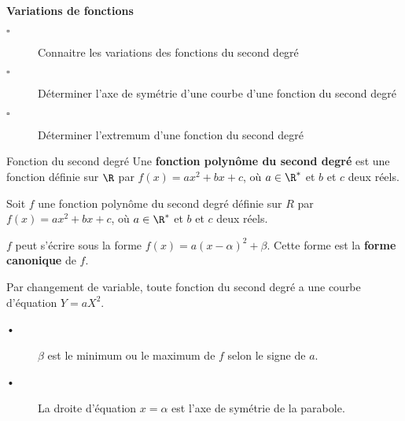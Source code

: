 \begin{titre}

\end{titre}


\begin{CpsCol}
\textbf{Variations de fonctions}
\begin{description}
\item[$\square$] Connaitre les variations des fonctions du second degré
\item[$\square$] Déterminer l'axe de symétrie d'une courbe d'une fonction du second degré
\item[$\square$] Déterminer l'extremum d'une fonction du second degré
\end{description}
\end{CpsCol}


\begin{DefT}{Fonction du second degré} 
Une \textbf{fonction polynôme du second degré} est une fonction définie sur $\R$ par $f(x) = ax^2+bx+c$, où $a \in \R^*$ et $b$ et $c$ deux réels.
\end{DefT}




\begin{Pp} 
Soit $f$ une fonction polynôme du second degré définie sur $R$ par $f(x) = ax^2+bx+c$, où $a \in \R^*$ et $b$ et $c$ deux réels.

$f$ peut s'écrire sous la forme $f(x)=a(x-\alpha)^2+ \beta$. Cette forme est la \textbf{forme canonique} de $f$.

Par changement de variable, toute fonction du second degré a une courbe d'équation $Y=aX^2$.

\begin{description}
\item[•] $\beta$ est le minimum ou le maximum de $f$ selon le signe de $a$.
\item[•] La droite d'équation $x=\alpha$ est l'axe de symétrie de la parabole.
\end{description}
\end{Pp}

